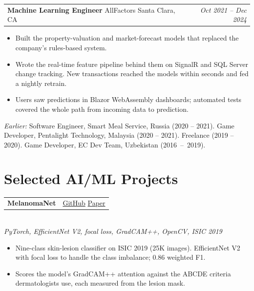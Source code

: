 \documentclass[letterpaper,11pt]{article}
\makeatletter
\newcommand{\experienceEntry}[4]{%
    \vspace{3pt}\noindent
    \begin{tabular*}{\textwidth}{@{}l@{\extracolsep{\fill}}r@{}}
        \textbf{\color{darktext}#1} {\color{lighttext}\textbar} {\color{accent}#2} {\color{lighttext}\textbar} {\color{lighttext}#3} & \textit{\color{lighttext}#4} \\
    \end{tabular*}\vspace{-4pt}
}
\newcommand{\projectEntryPaper}[4]{%
    \vspace{2pt}\noindent
    \begin{tabular*}{\textwidth}{@{}l@{\extracolsep{\fill}}r@{}}
        {\textbf{\color{accent}#1}} & {\small\href{#3}{\color{linkcolor}GitHub} \enspace\color{lighttext}\textbar\enspace \href{#4}{\color{linkcolor}Paper}} \\
    \end{tabular*}\vspace{-3pt}\\
    {\small\color{lighttext}\textit{#2}}\vspace{-2pt}
}
\makeatother
\begin{document}
\experienceEntry{Machine Learning Engineer}{AllFactors}{Santa Clara, CA}{Oct 2021 -- Dec 2024}
\begin{itemize}
    \item Built the property-valuation and market-forecast models that replaced the company's rules-based system.
    \item Wrote the real-time feature pipeline behind them on SignalR and SQL Server change tracking. New transactions reached the models within seconds and fed a nightly retrain.
    \item Users saw predictions in Blazor WebAssembly dashboards; automated tests covered the whole path from incoming data to prediction.
\end{itemize}

\vspace{5pt}\noindent
{\color{lighttext}\textit{Earlier:} Software Engineer, Smart Meal Service, Russia (2020 -- 2021). Game Developer, Pentalight Technology, Malaysia (2020 -- 2021). Freelance (2019 -- 2020). Game Developer, EC Dev Team, Uzbekistan (2016~--~2019).}

\section{Selected AI/ML Projects}


\projectEntryPaper{MelanomaNet}{PyTorch, EfficientNet V2, focal loss, GradCAM++, OpenCV, ISIC 2019}
{https://github.com/suxrobgm/explainable-melanoma}
{https://arxiv.org/abs/2512.09289}
\begin{itemize}
    \item Nine-class skin-lesion classifier on ISIC 2019 (25K images). EfficientNet V2 with focal loss to handle the class imbalance; 0.86 weighted F1.
    \item Scores the model's GradCAM++ attention against the ABCDE criteria dermatologists use, each measured from the lesion mask.
\end{itemize}
\end{document}
